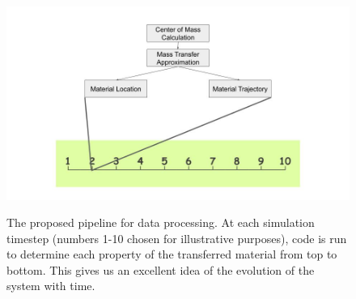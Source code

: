 \documentclass[linenumbers]{aastex631} %
\begin{document}
\begin{figure}
    \centering
    \includegraphics[width = \linewidth]{Untitled presentation.jpg}
    \label{fig:Untitled image}
    \caption{The proposed pipeline for data processing. At each simulation timestep (numbers 1-10 chosen for illustrative purposes), code is run to determine each property of the transferred material from top to bottom. This gives us an excellent idea of the evolution of the system with time.}
\end{figure}

{}

\end{document}
